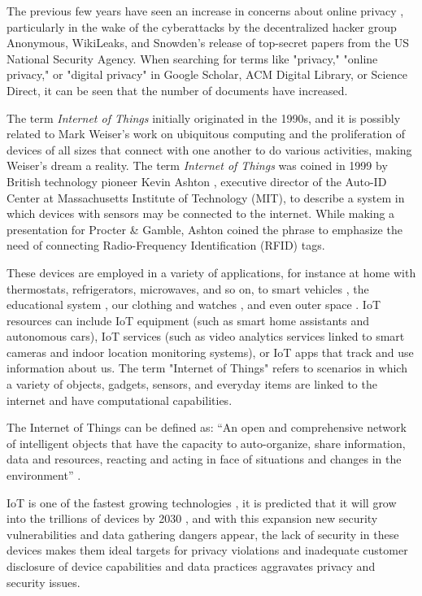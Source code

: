 \documentclass[manuscript,screen,review,natbib=false]{acmart}
\begin{document}
The previous few years have seen an increase in concerns about online privacy \cite{emami2019exploring, park2022personal, zhang2022peer},
particularly in the wake of the cyberattacks by the decentralized hacker
group Anonymous, WikiLeaks, and Snowden's release of top-secret papers
from the US National Security Agency. When searching for terms like "privacy,"
"online privacy," or "digital privacy" in Google Scholar, ACM Digital Library,
or Science Direct, it can be seen that the number of documents have increased.

The term \textit{Internet of Things} initially originated in the 1990s, and it is
possibly related to Mark Weiser's work on ubiquitous computing \cite{weiser1991computer}
and the proliferation
of devices of all sizes that connect with one another to do various activities,
making Weiser's dream a reality. The term \textit{Internet of Things} was coined in
1999 by British technology pioneer Kevin Ashton \cite{KevinThat}, executive director of the
Auto-ID Center at Massachusetts Institute of Technology (MIT), to describe
a system in which devices with sensors may be connected to the internet.
While making a presentation for Procter \& Gamble, Ashton coined the phrase
to emphasize the need of connecting Radio-Frequency Identification (RFID) tags.

These devices are employed in a variety of applications, for instance at home \cite{marikyan2019systematic}
with thermostats, refrigerators, microwaves, and so on, to
smart vehicles \cite{arena2020overview}, the educational system \cite{al2020survey},
our clothing and watches \cite{niknejad2020comprehensive}, and even
outer space \cite{AkyildizInternet}. IoT resources can include IoT equipment (such as smart home
assistants and autonomous cars), IoT services (such as video analytics
services linked to smart cameras and indoor location monitoring systems),
or IoT apps that track and use information about us. The term "Internet of
Things" refers to scenarios in which a variety of objects, gadgets, sensors,
and everyday items are linked to the internet and have computational capabilities.

The Internet of Things can be defined as: ``An open and comprehensive network
of intelligent objects that have the capacity to auto-organize, share information,
data and resources, reacting and acting in face of situations and changes
in the environment'' \cite{madakam2015internet}.

IoT is one of the fastest growing technologies \cite{MohammadState}, it
is predicted that it will grow into the trillions of devices by 2030 \cite{SarawiInternet},
and with this expansion new security vulnerabilities and data gathering
dangers appear, the lack of security in these devices makes them ideal targets
for privacy violations and inadequate customer disclosure of device capabilities
and data practices aggravates privacy and security issues.
\end{document}
